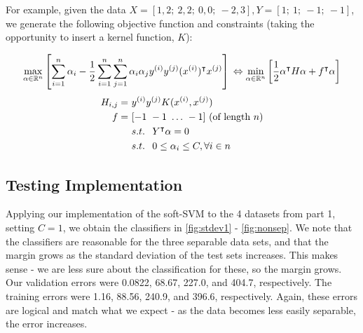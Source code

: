 \documentclass[10pt,letterpaper]{article}
\begin{document}
For example, given the data $X = [1, 2;\ 2, 2;\ 0, 0;\ -2, 3], Y = [1;\ 1;\ -1;\ -1]$, we generate the following objective function and constraints (taking the opportunity to insert a kernel function, $K$):

\begin{equation}
\max_{\alpha \in \mathbb{R}^n} \left[\sum_{i=1}^n \alpha_i - \dfrac{1}{2} \sum_{i=1}^n \sum_{j=1}^n \alpha_i \alpha_j y^{(i)} y^{(j)} (x^{(i)})^\intercal x^{(j)} \right] \\
\Leftrightarrow \min_{\alpha \in \mathbb{R}^n}\left[\dfrac{1}{2} \alpha^\intercal H \alpha + f^\intercal \alpha\right]
\end{equation}
\begin{align}
H_{i,j} =&\ y^{(i)} y^{(j)} K(x^{(i)},x^{(j)}) \\
f =&\ [-1\ -1\ \ldots\ -1]\ \text{(of length $n$)} \\
&\ s.t. \hspace{.75em} Y^\intercal \alpha = 0 \\
&\ s.t. \hspace{.75em} 0 \le \alpha_i \le C, \forall i \in n
\end{align}

\subsection{Testing Implementation}

Applying our implementation of the soft-SVM to the 4 datasets from part 1, setting $C = 1$, we obtain the classifiers in \ref{fig:stdev1} - \ref{fig:nonsep}. We note that the classifiers are reasonable for the three separable data sets, and that the margin grows as the standard deviation of the test sets increases. This makes sense - we are less sure about the classification for these, so the margin grows. Our validation errors were 0.0822, 68.67, 227.0, and 404.7, respectively. The training errors were 1.16, 88.56, 240.9, and 396.6, respectively. Again, these errors are logical and match what we expect - as the data becomes less easily separable, the error increases.
\end{document}
